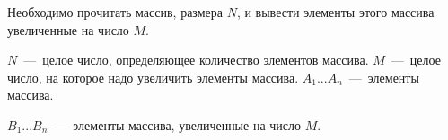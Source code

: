 Необходимо прочитать массив, размера $N$, и вывести элементы этого массива увеличенные на число $M$.

\InputFile

$N$~---~целое число, определяющее количество элементов массива.
$M$~---~целое число, на которое надо увеличить элементы массива.
$A_1 ... A_n$~---~элементы массива. 
\OutputFile

$B_1 ... B_n$~---~элементы массива, увеличенные на число $M$.

\SAMPLES
